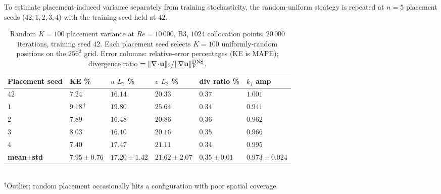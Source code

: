 \label{sec:placement_variance}

To estimate placement-induced variance separately from training stochasticity, the random-uniform strategy is repeated at $n=5$ placement seeds ($42, 1, 2, 3, 4$) with the training seed held at $42$.

\begin{table}[!htbp]
    \centering
    \caption{Random $K=100$ placement variance at $Re=10\,000$, B3, $1024$ collocation points, $20\,000$ iterations, training seed $42$. Each placement seed selects $K=100$ uniformly-random positions on the $256^2$ grid. Error columns: relative-error percentages (KE is MAPE); divergence ratio $= \Vert\nabla\!\cdot\!\mathbf{u}\Vert_2 / \Vert\nabla\mathbf{u}\Vert_F^{\rm DNS}$.}
    \label{tab:placement_variance}
    \footnotesize
    \setlength{\tabcolsep}{3pt}
    \begin{tabularx}{\textwidth}{
        >{\raggedright\arraybackslash}p{1.8cm}
        >{\centering\arraybackslash}X
        >{\centering\arraybackslash}X
        >{\centering\arraybackslash}X
        >{\centering\arraybackslash}X
        >{\centering\arraybackslash}X
    }
    \toprule
    \textbf{Placement seed} & \textbf{KE \%} & \textbf{$u$ $L_2$ \%} & \textbf{$v$ $L_2$ \%} & \textbf{div ratio \%} & \textbf{$k_f$ amp} \\
    \midrule
    $42$ & $7.24$            & $16.14$ & $20.33$ & $0.37$ & $\mathbf{1.001}$ \\
    $1$  & $\mathbf{9.18}$\,$^\dagger$ & $19.80$ & $25.64$ & $0.34$ & $0.941$ \\
    $2$  & $7.89$            & $16.48$ & $20.86$ & $0.36$ & $0.962$ \\
    $3$  & $8.03$            & $16.10$ & $20.16$ & $0.35$ & $0.966$ \\
    $4$  & $7.40$            & $17.47$ & $21.11$ & $0.34$ & $0.995$ \\
    \midrule
    \textbf{mean$\pm$std} & $\mathbf{7.95 {\pm} 0.76}$ & $17.20 {\pm} 1.42$ & $21.62 {\pm} 2.07$ & $\mathbf{0.35 {\pm} 0.01}$ & $0.973 {\pm} 0.024$ \\
    \bottomrule
    \end{tabularx}
    \\[2pt]
    \footnotesize $^\dagger$Outlier; random placement occasionally hits a configuration with poor spatial coverage.
\end{table}

